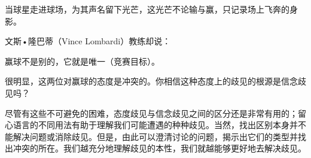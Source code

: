 \begin{displayquote}
当球星走进球场，为其声名留下光芒，这光芒不论输与赢，只记录场上飞奔的身影。
\end{displayquote}

文斯•隆巴蒂（Vince Lombardi）教练却说：

\begin{displayquote}
赢球不是别的，它就是唯一（竞赛目标）。
\end{displayquote}

很明显，这两位对赢球的态度是冲突的。你相信这种态度上的歧见的根源是信念歧见吗？

尽管有这些不可避免的困难，态度歧见与信念歧见之间的区分还是非常有用的；留心语言的不同用法有助于理解我们可能遭遇的种种歧见。当然，找出区别本身并不能解决问题或消除歧见。但是，由此可以澄清讨论的问题，揭示出它们的类型并找出冲突的所在。我们越充分地理解歧见的本性，我们就越能够更好地去解决歧见。 